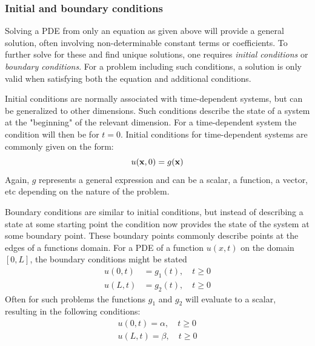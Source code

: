 \subsubsection{Initial and boundary conditions}
Solving a PDE from only an equation as given above will provide a general solution, often involving non-determinable constant terms or coefficients. To further solve for these and find unique solutions, one requires \textit{initial conditions} or \textit{boundary conditions}. For a problem including such conditions, a solution is only valid when satisfying both the equation and additional conditions. 

Initial conditions are normally associated with time-dependent systems, but can be generalized to other dimensions. Such conditions describe the state of a system at the "beginning" of the relevant dimension. For a time-dependent system the condition will then be for $t=0$. Initial conditions for time-dependent systems are commonly given on the form: 
\begin{equation}
    u(\bold{x}, 0) = g(\bold{x})
\end{equation}
Again, $g$ represents a general expression and can be a scalar, a function, a vector, etc depending on the nature of the problem. 

Boundary conditions are similar to initial conditions, but instead of describing a state at some starting point the condition now provides the state of the system at some boundary point. These boundary points commonly describe points at the edges of a functions domain. For a PDE of a function $u(x,t)$ on the domain $[0, L]$, the boundary conditions might be stated
\begin{equation}
    \begin{split}
        u(0, t) &= g_1(t), \quad t\geq0 \\
        u(L, t) &= g_2(t), \quad t\geq0
    \end{split}
\end{equation}
Often for such problems the functions $g_1$ and $g_2$ will evaluate to a scalar, resulting in the following conditions: 
\begin{equation}
    \begin{split}
        u(0, t) = \alpha, \quad t\geq0 \\
        u(L, t) = \beta, \quad t\geq0
    \end{split}
\end{equation}

